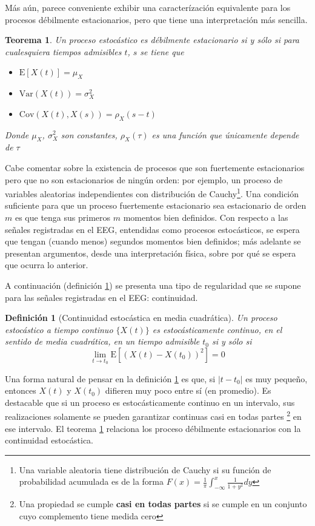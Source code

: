 \documentclass[12pt,a4paper]{mitthesis}
\newtheorem{defn}{Definici\'on}
\newtheorem{thrm}{Teorema}
\newcommand{\E}[1]{\mathrm{E}\left[ #1 \right]}
\newcommand{\Var}[1]{\mathrm{Var}\left( #1 \right)}
\newcommand{\Cov}[1]{\mathrm{Cov}\left( #1 \right)}
\newcommand{\abso}[1]{\left| #1 \right|}
\begin{document}
M\'as a\'un, parece conveniente exhibir una caracter\'izaci\'on equivalente para los procesos 
d\'ebilmente estacionarios, pero que tiene una interpretaci\'on m\'as sencilla.
\begin{thrm}
Un proceso estoc\'astico es d\'ebilmente estacionario si y s\'olo si para cualesquiera tiempos 
admisibles $t$, $s$ se tiene que
\begin{itemize}
\item $\E{X(t)} = \mu_X$
\item $\Var{X(t)} = \sigma^{2}_X$
\item $\Cov{X(t),X(s)} = \rho_X (s-t)$
\end{itemize}
Donde $\mu_X$, $\sigma^{2}_X$ son constantes, $\rho_X(\tau)$ es una funci\'on que \'unicamente 
depende de $\tau$
\label{est_usual}
\end{thrm}

Cabe comentar  sobre la existencia de procesos que son fuertemente estacionarios pero que no son 
estacionarios de ning\'un orden: por ejemplo, un proceso de variables aleatorias independientes con 
distribuci\'on de Cauchy\footnote{Una variable aleatoria tiene distribuci\'on de Cauchy si su 
funci\'on de probabilidad acumulada es de la forma 
$\displaystyle F(x) = \frac{1}{\pi} \int_{-\infty}^{x} \frac{1}{1+y^{2}} dy$}.
Una condici\'on suficiente para que un proceso fuertemente estacionario sea estacionario de orden 
$m$ es que tenga sus primeros $m$ momentos bien definidos.
Con respecto a las se\~nales registradas en el EEG, entendidas como procesos estoc\'asticos, se 
espera que tengan (cuando menos) segundos momentos bien definidos; m\'as adelante se presentan 
argumentos, desde una interpretaci\'on f\'isica, sobre por qu\'e se espera que ocurra lo anterior.

A continuaci\'on (definici\'on \ref{cont_est}) se presenta una tipo de regularidad que se supone
para las se\~nales registradas en el EEG: continuidad.

\begin{defn}[Continuidad estoc\'astica en media cuadr\'atica]
Un proceso estoc\'astico a tiempo continuo $\{ X(t) \}$ es estoc\'asticamente continuo, en el 
sentido de media cuadr\'atica, en un tiempo admisible $t_0$ si y s\'olo si
\begin{equation*}
\lim_{t \rightarrow t_0} \E{\left( X(t) - X(t_0) \right)^{2}} = 0
\end{equation*}
\label{cont_est}
\end{defn}

Una forma natural de pensar en la definici\'on \ref{cont_est} es que, si $\abso{t-t_0}$ es muy 
peque\~no, entonces $X(t)$ y $X(t_0)$ difieren muy poco entre s\'i (en promedio).
Es destacable que si un proceso es estoc\'asticamente continuo en un intervalo, sus realizaciones 
solamente se pueden garantizar continuas casi en todas partes \footnote{Una propiedad se cumple 
\textbf{casi en todas partes} si se cumple en un conjunto cuyo complemento tiene medida cero} en 
ese intervalo.
El teorema \ref{cont_est} relaciona los proceso d\'ebilmente estacionarios con la continuidad
estoc\'astica.
\end{document}
